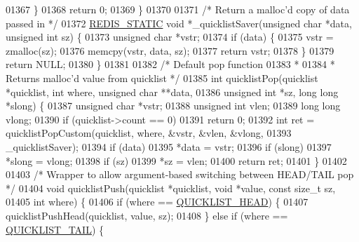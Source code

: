 \begin{DoxyCode}
{{{{{{{{{{01367     \}
01368     \textcolor{keywordflow}{return} 0;
01369 \}
01370 
01371 \textcolor{comment}{/* Return a malloc'd copy of data passed in */}
01372 \hyperlink{quicklist_8c_a9c22c9c899458021930a552a4f94d317}{REDIS\_STATIC} \textcolor{keywordtype}{void} *\_quicklistSaver(\textcolor{keywordtype}{unsigned} \textcolor{keywordtype}{char} *data, \textcolor{keywordtype}{unsigned} \textcolor{keywordtype}{int} sz) \{
01373     \textcolor{keywordtype}{unsigned} \textcolor{keywordtype}{char} *vstr;
01374     \textcolor{keywordflow}{if} (data) \{
01375         vstr = zmalloc(sz);
01376         memcpy(vstr, data, sz);
01377         \textcolor{keywordflow}{return} vstr;
01378     \}
01379     \textcolor{keywordflow}{return} NULL;
01380 \}
01381 
01382 \textcolor{comment}{/* Default pop function}
01383 \textcolor{comment}{ *}
01384 \textcolor{comment}{ * Returns malloc'd value from quicklist */}
01385 \textcolor{keywordtype}{int} quicklistPop(quicklist *quicklist, \textcolor{keywordtype}{int} where, \textcolor{keywordtype}{unsigned} \textcolor{keywordtype}{char} **data,
01386                  \textcolor{keywordtype}{unsigned} \textcolor{keywordtype}{int} *sz, \textcolor{keywordtype}{long} \textcolor{keywordtype}{long} *slong) \{
01387     \textcolor{keywordtype}{unsigned} \textcolor{keywordtype}{char} *vstr;
01388     \textcolor{keywordtype}{unsigned} \textcolor{keywordtype}{int} vlen;
01389     \textcolor{keywordtype}{long} \textcolor{keywordtype}{long} vlong;
01390     \textcolor{keywordflow}{if} (quicklist->count == 0)
01391         \textcolor{keywordflow}{return} 0;
01392     \textcolor{keywordtype}{int} ret = quicklistPopCustom(quicklist, where, &vstr, &vlen, &vlong,
01393                                  \_quicklistSaver);
01394     \textcolor{keywordflow}{if} (data)
01395         *data = vstr;
01396     \textcolor{keywordflow}{if} (slong)
01397         *slong = vlong;
01398     \textcolor{keywordflow}{if} (sz)
01399         *sz = vlen;
01400     \textcolor{keywordflow}{return} ret;
01401 \}
01402 
01403 \textcolor{comment}{/* Wrapper to allow argument-based switching between HEAD/TAIL pop */}
01404 \textcolor{keywordtype}{void} quicklistPush(quicklist *quicklist, \textcolor{keywordtype}{void} *value, \textcolor{keyword}{const} size\_t sz,
01405                    \textcolor{keywordtype}{int} where) \{
01406     \textcolor{keywordflow}{if} (where == \hyperlink{quicklist_8h_a4cbe05838d62e8d1c8bfa46c9f1b083a}{QUICKLIST\_HEAD}) \{
01407         quicklistPushHead(quicklist, value, sz);
01408     \} \textcolor{keywordflow}{else} \textcolor{keywordflow}{if} (where == \hyperlink{quicklist_8h_a602bad1be3a6abb2a66ef87387cb7698}{QUICKLIST\_TAIL}) \{
}}}}}}}}}}
\end{DoxyCode}
